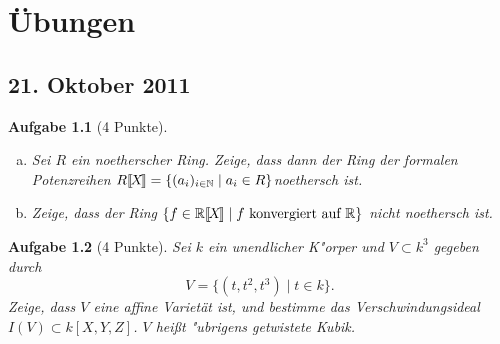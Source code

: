 \documentclass[a4paper, 12pt, numbers=noendperiod, chapterprefix=true, headsepline]{scrbook}
\renewcommand{\thesection}{\arabic{section}}
\renewcommand*{\othersectionlevelsformat}[3]{\ifstr{#1}{section}{\S\ #3\autodot}{#3\autodot}\enskip}
\renewcommand*{\sectionmarkformat}{\S \thesection\autodot\enskip}
\theoremstyle{break}
\newtheorem{Aufg}{Aufgabe}
\theoremstyle{nonumberbreak}
\theoremstyle{nonumberplain}
\newcommand{\formal}[2]{\mbox{$#1$[\hspace{-0.15em}[\hspace{-0.15em}$#2$\hspace{-0.15em}]\hspace{-0.15em}]}} %
\newcommand{\set}[2]{\{#1\mid #2\}} %
\newcommand{\R}{\mathbb{R}}
\newcommand{\N}{\mathbb{N}}
\begin{document}

\appendix


\chapter{\"Ubungen}

\renewcommand*{\othersectionlevelsformat}[3]{\ifstr{#1}{section}{\"Ubung\ #3\ vom\ }{#3\autodot\enskip}}

\renewcommand*{\sectionmarkformat}{\"Ubung \thesection\autodot\ vom\enskip}

\setcounter{section}{0}

\section{21. Oktober 2011}
\setcounter{Aufg}{0} %
\setcounter{Loes}{0}

\begin{Aufg}[4 Punkte]\begin{enumerate}[a)]
\item
	Sei $R$ ein noetherscher Ring. Zeige, dass dann der Ring der formalen Potenzreihen $\formal{R}{X} = \{(a_i)_{i\in \N} \mid a_i \in R\}$noethersch ist.
\item
	Zeige, dass der Ring $\{ f \in \formal{\R}{X} \mid f \textrm{ konvergiert auf } \R \}$ nicht noethersch ist.
\end{enumerate}\end{Aufg}

\begin{Aufg}[4 Punkte]
Sei $k$ ein unendlicher K"orper und $V\subset k^3$ gegeben durch
	\[V = \set{(t,t^2,t^3)}{t\in k}.\]
Zeige, dass $V$ eine affine Variet\"at ist, und bestimme das Verschwindungsideal $I(V) \subset k[X,Y,Z]$. $V$ hei\ss t "ubrigens \emph{getwistete Kubik}.
\end{Aufg}
\end{document}
